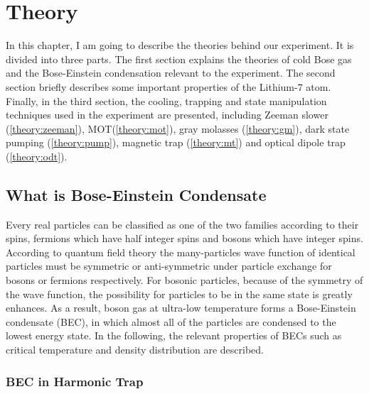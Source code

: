 \chapter{Theory}

In this chapter, I am going to describe the theories behind our experiment. It is divided into three parts. The first section explains the theories of cold Bose gas and the Bose-Einstein condensation relevant to the experiment. The second section briefly describes some important properties of the Lithium-$7$ atom. Finally, in the third section, the cooling, trapping and state manipulation techniques used in the experiment are presented, including Zeeman slower (\ref{theory:zeeman}), MOT(\ref{theory:mot}), gray molasses (\ref{theory:gm}), dark state pumping (\ref{theory:pump}), magnetic trap (\ref{theory:mt}) and optical dipole trap (\ref{theory:odt}).

\section{What is Bose-Einstein Condensate}\label{theory:bec}

Every real particles can be classified as one of the two families according to their spins, fermions which have half integer spins and bosons which have integer spins. According to quantum field theory\cite{spin-statistics1,spin-statistics2} the many-particles wave function of identical particles must be symmetric or anti-symmetric under particle exchange for bosons or fermions respectively. For bosonic particles, because of the symmetry of the wave function, the possibility for particles to be in the same state is greatly enhances. As a result, boson gas at ultra-low temperature forms a Bose-Einstein condensate (BEC), in which almost all of the particles are condensed to the lowest energy state. In the following, the relevant properties of BECs such as critical temperature and density distribution are described.

\subsection{BEC in Harmonic Trap}

